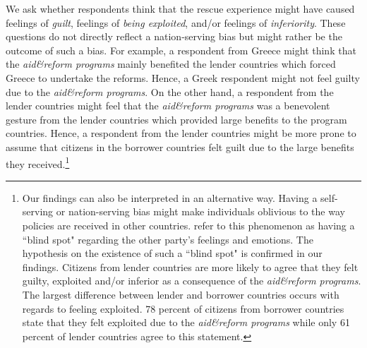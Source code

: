 We ask whether respondents think that the rescue experience might
have caused feelings of \textit{guilt}, feelings of \textit{being
exploited}, and/or feelings of \textit{inferiority}. These questions do not directly reflect a nation-serving bias but might rather be the outcome of such a bias. For example, a respondent from Greece might think that the \textit{aid\&reform programs} mainly benefited the lender countries which forced Greece to undertake the reforms. Hence, a Greek respondent might not feel guilty due to the \textit{aid\&reform programs}. On the other hand, a respondent from the lender countries might feel that the \textit{aid\&reform programs} was a benevolent gesture from the lender countries which provided large benefits to the program countries. Hence, a respondent from the lender countries might be more prone to assume that citizens in the borrower countries felt guilt due to the large benefits they received.\footnote{Our findings can also be interpreted in an alternative way.  Having a self-serving or nation-serving bias might make individuals oblivious to
the way policies are received in other countries. 
\cite{dezso} refer to this phenomenon as having a ``blind spot" regarding the other party's 
feelings and emotions. The hypothesis on the existence of such a ``blind spot" is confirmed in our findings.
Citizens from lender countries are more likely to agree that they felt guilty, exploited and/or inferior as a 
consequence of the \textit{aid\&reform programs}. The largest difference between lender and borrower countries occurs with regards to feeling exploited.
78 percent  of citizens from borrower countries state that they felt exploited due to the \textit{aid\&reform programs} while only 61 percent of lender countries
agree to this statement. 
}


